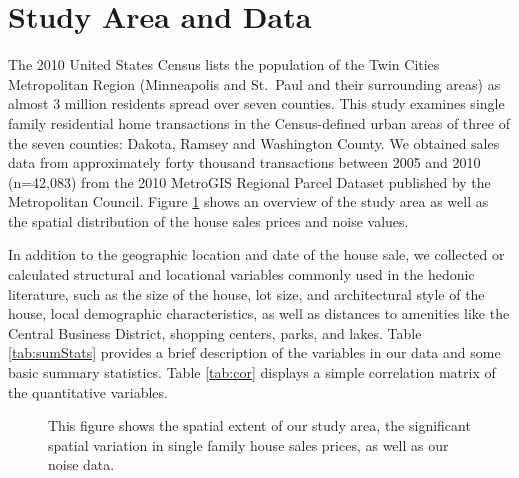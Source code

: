 \documentclass{article}\usepackage[]{graphicx}\usepackage[]{color}
\begin{document}
\section{Study Area and Data}
The 2010 United States Census lists the population of the Twin Cities Metropolitan Region (Minneapolis and St.\ Paul and their surrounding areas) as almost 3 million residents spread over seven counties. This study examines single family residential home transactions in the Census-defined urban areas of three of the seven counties: Dakota, Ramsey and Washington County. We obtained sales data from approximately forty thousand transactions between 2005 and 2010 (n=42,083) from the 2010 MetroGIS Regional Parcel Dataset published by the Metropolitan Council. Figure \ref{fig:overview} shows an overview of the study area as well as the spatial distribution of the house sales prices and noise values. 

In addition to the geographic location and date of the house sale, we collected or calculated structural and locational variables commonly used in the hedonic literature, such as the size of the house, lot size, and architectural style of the house, local demographic characteristics, as well as distances to amenities like the Central Business District, shopping centers, parks, and lakes. Table \ref{tab:sumStats} provides a brief description of the variables in our data and some basic summary statistics. Table \ref{tab:cor} displays a simple correlation matrix of the quantitative variables.

\begin{figure}
\caption{This figure shows the spatial extent of our study area, the significant spatial variation in single family house sales prices, as well as our noise data.}
\label{fig:overview}
\end{figure}
\end{document}
